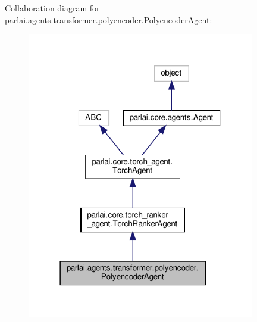 Collaboration diagram for parlai.\+agents.\+transformer.\+polyencoder.\+Polyencoder\+Agent\+:
\nopagebreak
\begin{figure}[H]
\begin{center}
\leavevmode
\includegraphics[width=282pt]{d5/d11/classparlai_1_1agents_1_1transformer_1_1polyencoder_1_1PolyencoderAgent__coll__graph}
\end{center}
\end{figure}
